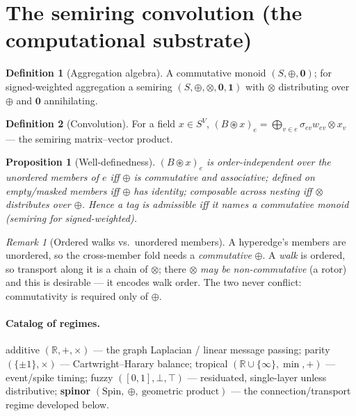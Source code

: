 \documentclass[11pt]{article}
\theoremstyle{definition}
\newtheorem{definition}{Definition}
\theoremstyle{plain}
\newtheorem{proposition}{Proposition}
\theoremstyle{remark}
\newtheorem{remark}{Remark}
\newcommand{\Spin}{\mathrm{Spin}}
\newcommand{\R}{\mathbb{R}}
\begin{document}
\section{The semiring convolution (the computational substrate)}
\begin{definition}[Aggregation algebra]
A commutative monoid $(S,\oplus,\mathbf0)$; for signed-weighted aggregation a semiring
$(S,\oplus,\otimes,\mathbf0,\mathbf1)$ with $\otimes$ distributing over $\oplus$ and $\mathbf0$ annihilating.
\end{definition}
\begin{definition}[Convolution]
For a field $x\in S^V$, $(B\circledast x)_e=\bigoplus_{v\in e}\sigma_{ev}w_{ev}\otimes x_v$ --- the semiring
matrix--vector product.
\end{definition}
\begin{proposition}[Well-definedness]\label{prop:wd}
$(B\circledast x)_e$ is order-independent over the unordered members of $e$ iff $\oplus$ is commutative and
associative; defined on empty/masked members iff $\oplus$ has identity; composable across nesting iff $\otimes$
distributes over $\oplus$. Hence a tag is admissible iff it names a commutative monoid (semiring for
signed-weighted).
\end{proposition}
\begin{remark}[Ordered walks vs.\ unordered members]\label{rem:order}
A hyperedge's members are unordered, so the cross-member fold needs a \emph{commutative} $\oplus$. A
\emph{walk} is ordered, so transport along it is a chain of $\otimes$; there $\otimes$ \emph{may be
non-commutative} (a rotor) and this is desirable --- it encodes walk order. The two never conflict:
commutativity is required only of $\oplus$.
\end{remark}

\paragraph{Catalog of regimes.} additive $(\R,+,\times)$ --- the graph Laplacian / linear message passing;
parity $(\{\pm1\},\times)$ --- Cartwright--Harary balance; tropical $(\R\cup\{\infty\},\min,+)$ --- event/spike
timing; fuzzy $([0,1],\bot,\top)$ --- residuated, single-layer unless distributive; \textbf{spinor}
$(\Spin,\ \oplus,\ \text{geometric product})$ --- the connection/transport regime developed below.
\end{document}
